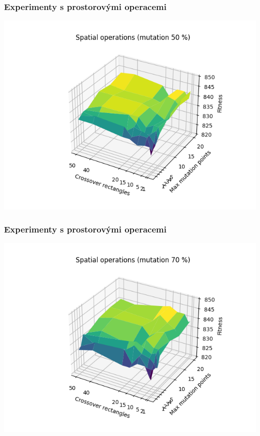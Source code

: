 \documentclass[10pt,xcolor=pdflatex,hyperref={unicode}]{beamer}
\begin{document}
\begin{frame}
\frametitle{Experimenty s prostorovými operacemi}
\includegraphics[width=0.8\paperwidth]{img/spatial50.png}
\end{frame}

\begin{frame}
\frametitle{Experimenty s prostorovými operacemi}
\includegraphics[width=0.8\paperwidth]{img/spatial70.png}
\end{frame}
\end{document}
